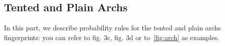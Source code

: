 \documentclass[8pt]{article}
\begin{document}
\subsection{Tented and Plain Archs}
%
%
In this part, we describe probability rules for the tented and plain archs 
fingerprints: you can refer to fig. 3c, fig. 3d or to~\cref{fig:arch} as examples.
\end{document}
